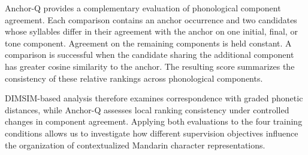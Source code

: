 Anchor-Q provides a complementary evaluation of phonological component
agreement. Each comparison contains an anchor occurrence and two candidates
whose syllables differ in their agreement with the anchor on one initial, final,
or tone component. Agreement on the remaining components is held constant. A
comparison is successful when the candidate sharing the additional component has
greater cosine similarity to the anchor. The resulting score summarizes the
consistency of these relative rankings across phonological components.

DIMSIM-based analysis therefore examines correspondence with graded phonetic
distances, while Anchor-Q assesses local ranking consistency under controlled
changes in component agreement. Applying both evaluations to the four training
conditions allows us to investigate how different supervision objectives
influence the organization of contextualized Mandarin character representations.
